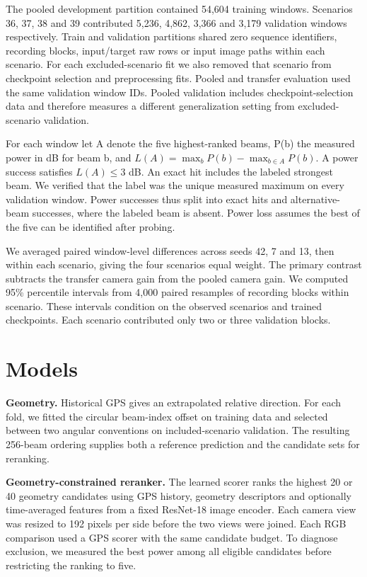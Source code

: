 \documentclass[10pt,journal,letterpaper]{IEEEtran}
\begin{document}
The pooled development partition contained 54,604 training windows. Scenarios 36, 37, 38 and 39 contributed 5,236, 4,862, 3,366 and 3,179 validation windows respectively. Train and validation partitions shared zero sequence identifiers, recording blocks, input/target raw rows or input image paths within each scenario. For each excluded-scenario fit we also removed that scenario from checkpoint selection and preprocessing fits. Pooled and transfer evaluation used the same validation window IDs. Pooled validation includes checkpoint-selection data and therefore measures a different generalization setting from excluded-scenario validation.

For each window let A denote the five highest-ranked beams, P(b) the measured power in dB for beam b, and $L(A)=\max_b P(b)-\max_{b\in A}P(b)$. A power success satisfies $L(A)\leq 3$ dB. An exact hit includes the labeled strongest beam. We verified that the label was the unique measured maximum on every validation window. Power successes thus split into exact hits and alternative-beam successes, where the labeled beam is absent. Power loss assumes the best of the five can be identified after probing.

We averaged paired window-level differences across seeds 42, 7 and 13, then within each scenario, giving the four scenarios equal weight. The primary contrast subtracts the transfer camera gain from the pooled camera gain. We computed 95\% percentile intervals from 4,000 paired resamples of recording blocks within scenario. These intervals condition on the observed scenarios and trained checkpoints. Each scenario contributed only two or three validation blocks.

\section{Models}

\textbf{Geometry.} Historical GPS gives an extrapolated relative direction. For each fold, we fitted the circular beam-index offset on training data and selected between two angular conventions on included-scenario validation. The resulting 256-beam ordering supplies both a reference prediction and the candidate sets for reranking.

\textbf{Geometry-constrained reranker.} The learned scorer ranks the highest 20 or 40 geometry candidates using GPS history, geometry descriptors and optionally time-averaged features from a fixed ResNet-18 image encoder. Each camera view was resized to 192 pixels per side before the two views were joined. Each RGB comparison used a GPS scorer with the same candidate budget. To diagnose exclusion, we measured the best power among all eligible candidates before restricting the ranking to five.
\end{document}
